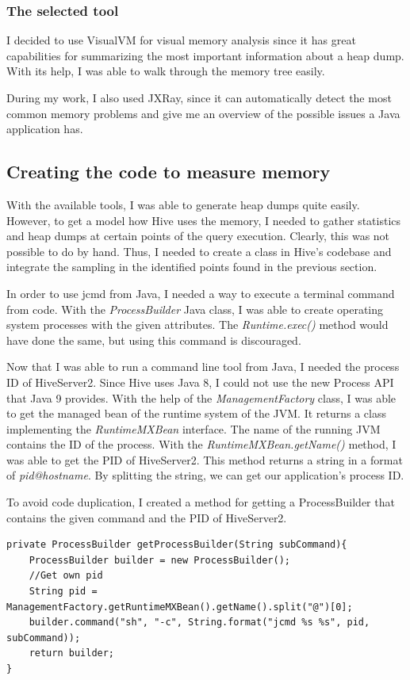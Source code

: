 \subsubsection{The selected tool}
I decided to use VisualVM for visual memory analysis since it has great capabilities for summarizing the most important information about a heap dump. With its help, I was able to walk through the memory tree easily.

During my work, I also used JXRay, since it can automatically detect the most common memory problems and give me an overview of the possible issues a Java application has.

\subsection{Creating the code to measure memory}
With the available tools, I was able to generate heap dumps quite easily. However, to get a model how Hive uses the memory, I needed to gather statistics and heap dumps at certain points of the query execution. Clearly, this was not possible to do by hand. Thus, I needed to create a class in Hive's codebase and integrate the sampling in the identified points found in the previous section.

In order to use jcmd from Java, I needed a way to execute a terminal command from code. With the \textit{ProcessBuilder} Java class, I was able to create operating system processes with the given attributes. The \textit{Runtime.exec()} method would have done the same, but using this command is discouraged. 

Now that I was able to run a command line tool from Java, I needed the process ID of HiveServer2. Since Hive uses Java 8, I could not use the new Process API that Java 9 provides. With the help of the \textit{ManagementFactory} class, I was able to get the managed bean of the runtime system of the JVM. It returns a class implementing the \textit{RuntimeMXBean} interface. The name of the running JVM contains the ID of the process. With the \textit{RuntimeMXBean.getName()} method, I was able to get the PID of HiveServer2. This method returns a string in a format of \textit{pid@hostname}. By splitting the string, we can get our application's process ID.

To avoid code duplication, I created a method for getting a ProcessBuilder that contains the given command and the PID of HiveServer2.

\begin{lstlisting}
private ProcessBuilder getProcessBuilder(String subCommand){
	ProcessBuilder builder = new ProcessBuilder();
	//Get own pid
	String pid = ManagementFactory.getRuntimeMXBean().getName().split("@")[0];
	builder.command("sh", "-c", String.format("jcmd %s %s", pid, subCommand));
	return builder;
}
\end{lstlisting}

